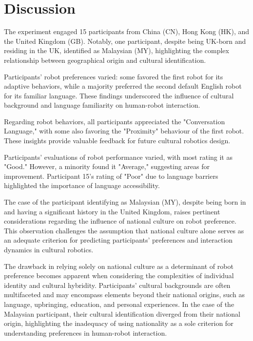 
\chapter{Discussion}

The experiment engaged 15 participants from China (CN), Hong Kong (HK), and the United Kingdom (GB). Notably, one participant, despite being UK-born and residing in the UK, identified as Malaysian (MY), highlighting the complex relationship between geographical origin and cultural identification.

Participants' robot preferences varied: some favored the first robot for its adaptive behaviors, while a majority preferred the second default English robot for its familiar language. These findings underscored the influence of cultural background and language familiarity on human-robot interaction.

Regarding robot behaviors, all participants appreciated the "Conversation Language," with some also favoring the "Proximity" behaviour of the first robot. These insights provide valuable feedback for future cultural robotics design.

Participants' evaluations of robot performance varied, with most rating it as "Good." However, a minority found it "Average," suggesting areas for improvement. Participant 15's rating of "Poor" due to language barriers highlighted the importance of language accessibility.

The case of the participant identifying as Malaysian (MY), despite being born in and having a significant history in the United Kingdom, raises pertinent considerations regarding the influence of national culture on robot preference. This observation challenges the assumption that national culture alone serves as an adequate criterion for predicting participants' preferences and interaction dynamics in cultural robotics.

The drawback in relying solely on national culture as a determinant of robot preference becomes apparent when considering the complexities of individual identity and cultural hybridity. Participants' cultural backgrounds are often multifaceted and may encompass elements beyond their national origins, such as language, upbringing, education, and personal experiences. In the case of the Malaysian participant, their cultural identification diverged from their national origin, highlighting the inadequacy of using nationality as a sole criterion for understanding preferences in human-robot interaction.

